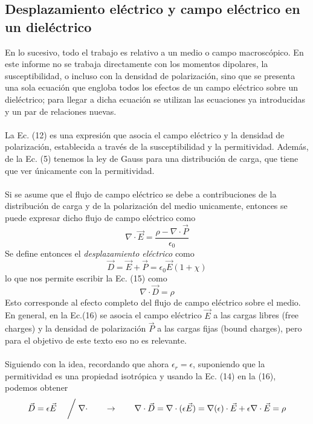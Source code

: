 \documentclass[12pt, notitlepage]{article}
\begin{document}
\subsection{Desplazamiento eléctrico y campo eléctrico en un dieléctrico}
En lo sucesivo, todo el trabajo es relativo a un medio o campo macroscópico. En este informe no se trabaja directamente con los momentos dipolares, la susceptibilidad, o incluso con la densidad de polarización, sino que se presenta una sola ecuación que engloba todos los efectos de un campo eléctrico sobre un dieléctrico; para llegar a dicha ecuación se utilizan las ecuaciones ya introducidas y un par de relaciones nuevas.\\\\
La Ec. (12) es una expresión que asocia el campo eléctrico y la densidad de polarización, establecida a través de la susceptibilidad y la permitividad. Además, de la Ec. (5) tenemos la ley de Gauss para una distribución de carga, que tiene que ver únicamente con la permitividad.\\\\
Si se asume que el flujo de campo eléctrico se debe a contribuciones de la distribución de carga y de la polarización del medio unicamente, entonces se puede expresar dicho flujo de campo eléctrico como
\begin{equation}
\nabla\cdot\vec{E} = \frac{\rho - \nabla\cdot\vec{P}}{\epsilon_0}
\end{equation}
Se define entonces el \textit{desplazamiento eléctrico} como
\begin{equation}
\vec{D} = \vec{E} + \vec{P} = \epsilon_0\vec{E}(1 + \chi)
\end{equation}
lo que nos permite escribir la Ec. (15) como
\begin{equation}
\nabla\cdot\vec{D} = \rho
\end{equation}
Esto corresponde al efecto completo del flujo de campo eléctrico sobre el medio. En general, en la Ec.(16) se asocia el campo eléctrico $\vec{E}$ a las cargas libres (free charges) y la densidad de polarización $\vec{P}$ a las cargas fijas (bound charges), pero para el objetivo de este texto eso no es relevante.\\\\
Siguiendo con la idea, recordando que ahora $\epsilon_r = \epsilon$, suponiendo que la permitividad es una propiedad isotrópica y usando la Ec. (14) en la (16), podemos obtener
\begin{equation}
\vec{D} = \epsilon\vec{E}\quad\biggm/\nabla\cdot\qquad\rightarrow\qquad\nabla\cdot\vec{D}=\nabla\cdot(\epsilon\vec{E}) = \nabla(\epsilon)\cdot\vec{E} + \epsilon\nabla\cdot\vec{E} = \rho
\end{equation}
\end{document}
